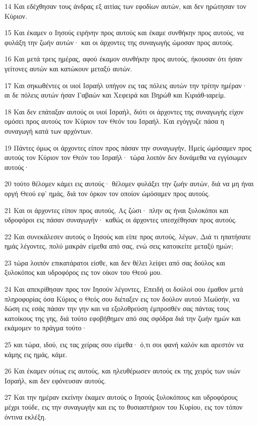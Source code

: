 \par 14 Και εδέχθησαν τους άνδρας εξ αιτίας των εφοδίων αυτών, και δεν ηρώτησαν τον Κύριον.
\par 15 Και έκαμεν ο Ιησούς ειρήνην προς αυτούς και έκαμε συνθήκην προς αυτούς, να φυλάξη την ζωήν αυτών· και οι άρχοντες της συναγωγής ώμοσαν προς αυτούς.
\par 16 Και μετά τρεις ημέρας, αφού έκαμον συνθήκην προς αυτούς, ήκουσαν ότι ήσαν γείτονες αυτών και κατώκουν μεταξύ αυτών.
\par 17 Και σηκωθέντες οι υιοί Ισραήλ υπήγον εις τας πόλεις αυτών την τρίτην ημέραν· αι δε πόλεις αυτών ήσαν Γαβαών και Χεφειρά και Βηρώθ και Κιριάθ-ιαρείμ.
\par 18 Και δεν επάταξαν αυτούς οι υιοί Ισραήλ, διότι οι άρχοντες της συναγωγής είχον ομόσει προς αυτούς τον Κύριον τον Θεόν του Ισραήλ. Και εγόγγυζε πάσα η συναγωγή κατά των αρχόντων.
\par 19 Πάντες όμως οι άρχοντες είπον προς πάσαν την συναγωγήν, Ημείς ώμόσαμεν προς αυτούς τον Κύριον τον Θεόν του Ισραήλ· τώρα λοιπόν δεν δυνάμεθα να εγγίσωμεν αυτούς·
\par 20 τούτο θέλομεν κάμει εις αυτούς· θέλομεν φυλάξει την ζωήν αυτών, διά να μη ήναι οργή Θεού εφ' ημάς, διά τον όρκον τον οποίον ώμόσαμεν προς αυτούς.
\par 21 Και οι άρχοντες είπον προς αυτούς, Ας ζώσι· πλην ας ήναι ξυλοκόποι και υδροφόροι εις πάσαν συναγωγήν· καθώς οι άρχοντες υπεσχέθησαν προς αυτούς.
\par 22 Και συνεκάλεσεν αυτούς ο Ιησούς και είπε προς αυτούς, λέγων, Διά τι ηπατήσατε ημάς λέγοντες, πολύ μακράν είμεθα από σας, ενώ σεις κατοικείτε μεταξύ ημών;
\par 23 τώρα λοιπόν επικατάρατοι είσθε, και δεν θέλει λείψει από σας δούλος και ξυλοκόπος και υδροφόρος εις τον οίκον του Θεού μου.
\par 24 Και απεκρίθησαν προς τον Ιησούν λέγοντες, Επειδή οι δούλοί σου έμαθον μετά πληροφορίας όσα Κύριος ο Θεός σου διέταξεν εις τον δούλον αυτού Μωϋσήν, να δώση εις εσάς πάσαν την γην και να εξολοθρεύση έμπροσθέν σας πάντας τους κατοίκους της γης, διά τούτο εφοβήθημεν από σας σφόδρα διά την ζωήν ημών και εκάμομεν το πράγμα τούτο·
\par 25 και τώρα, ιδού, εις τας χείρας σου είμεθα· ό,τι σοι φανή καλόν και αρεστόν να κάμης εις ημάς, κάμε.
\par 26 Και έκαμεν ούτως εις αυτούς, και ηλευθέρωσεν αυτούς εκ της χειρός των υιών Ισραήλ, και δεν εφόνευσαν αυτούς.
\par 27 Και την ημέραν εκείνην έκαμεν αυτούς ο Ιησούς ξυλοκόπους και υδροφόρους μέχρι τούδε, εις την συναγωγήν και εις το θυσιαστήριον του Κυρίου, εις τον τόπον όντινα εκλέξη.

